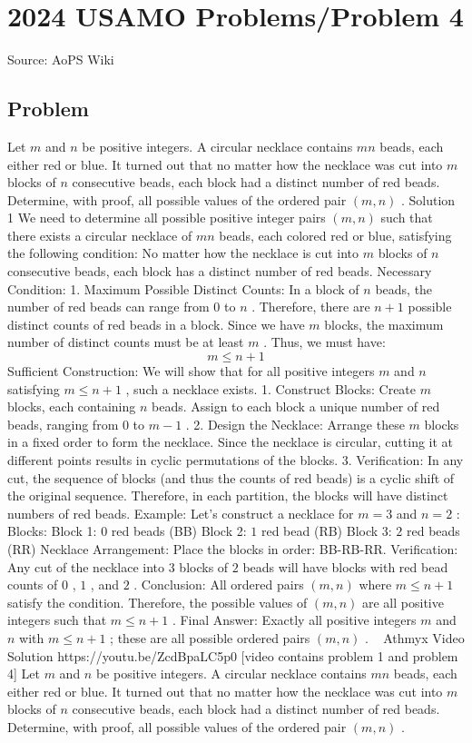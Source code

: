 \documentclass[12pt]{article}
\begin{document}
\section*{{2024 USAMO Problems/Problem 4}}
Source: AoPS Wiki

\subsection*{Problem}
Let $m$ and $n$ be positive integers. A circular necklace contains $m n$ beads, each either red or blue. It turned out that no matter how the necklace was cut into $m$ blocks of $n$ consecutive beads, each block had a distinct number of red beads. Determine, with proof, all possible values of the ordered pair $(m, n)$ . Solution 1 We need to determine all possible positive integer pairs $(m, n)$ such that there exists a circular necklace of $mn$ beads, each colored red or blue, satisfying the following condition: No matter how the necklace is cut into $m$ blocks of $n$ consecutive beads, each block has a distinct number of red beads. Necessary Condition: 1. Maximum Possible Distinct Counts:
In a block of $n$ beads, the number of red beads can range from $0$ to $n$ .
Therefore, there are $n + 1$ possible distinct counts of red beads in a block.
Since we have $m$ blocks, the maximum number of distinct counts must be at least $m$ .
Thus, we must have: \[m \leq n + 1\] Sufficient Construction: We will show that for all positive integers $m$ and $n$ satisfying $m \leq n + 1$ , such a necklace exists. 1. Construct Blocks:
Create $m$ blocks, each containing $n$ beads. Assign to each block a unique number of red beads, ranging from $0$ to $m - 1$ . 2. Design the Necklace:
Arrange these $m$ blocks in a fixed order to form the necklace. Since the necklace is circular, cutting it at different points results in cyclic permutations of the blocks. 3. Verification:
In any cut, the sequence of blocks (and thus the counts of red beads) is a cyclic shift of the original sequence. Therefore, in each partition, the blocks will have distinct numbers of red beads. Example: Let's construct a necklace for $m = 3$ and $n = 2$ : Blocks:
Block 1: $0$ red beads (BB)
Block 2: $1$ red bead (RB)
Block 3: $2$ red beads (RR) Necklace Arrangement:
Place the blocks in order: BB-RB-RR. Verification:
Any cut of the necklace into $3$ blocks of $2$ beads will have blocks with red bead counts of $0$ , $1$ , and $2$ . Conclusion: All ordered pairs $(m, n)$ where $m \leq n + 1$ satisfy the condition.
Therefore, the possible values of $(m, n)$ are all positive integers such that $m \leq n + 1$ . Final Answer: Exactly all positive integers $m$ and $n$ with $m \leq n + 1$ ; these are all possible ordered pairs $(m, n)$ . ~ Athmyx Video Solution https://youtu.be/ZcdBpaLC5p0 [video contains problem 1 and problem 4] Let $m$ and $n$ be positive integers. A circular necklace contains $m n$ beads, each either red or blue. It turned out that no matter how the necklace was cut into $m$ blocks of $n$ consecutive beads, each block had a distinct number of red beads. Determine, with proof, all possible values of the ordered pair $(m, n)$ .
\end{document}
